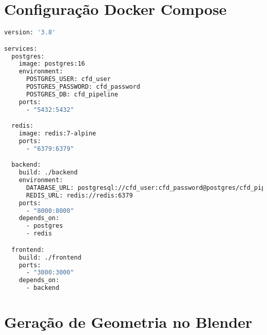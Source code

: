 \section{Configuração Docker Compose}

\begin{lstlisting}[language=bash, caption={docker-compose.yml simplificado}]
version: '3.8'

services:
  postgres:
    image: postgres:16
    environment:
      POSTGRES_USER: cfd_user
      POSTGRES_PASSWORD: cfd_password
      POSTGRES_DB: cfd_pipeline
    ports:
      - "5432:5432"

  redis:
    image: redis:7-alpine
    ports:
      - "6379:6379"

  backend:
    build: ./backend
    environment:
      DATABASE_URL: postgresql://cfd_user:cfd_password@postgres/cfd_pipeline
      REDIS_URL: redis://redis:6379
    ports:
      - "8000:8000"
    depends_on:
      - postgres
      - redis

  frontend:
    build: ./frontend
    ports:
      - "3000:3000"
    depends_on:
      - backend
\end{lstlisting}

\section{Geração de Geometria no Blender}

